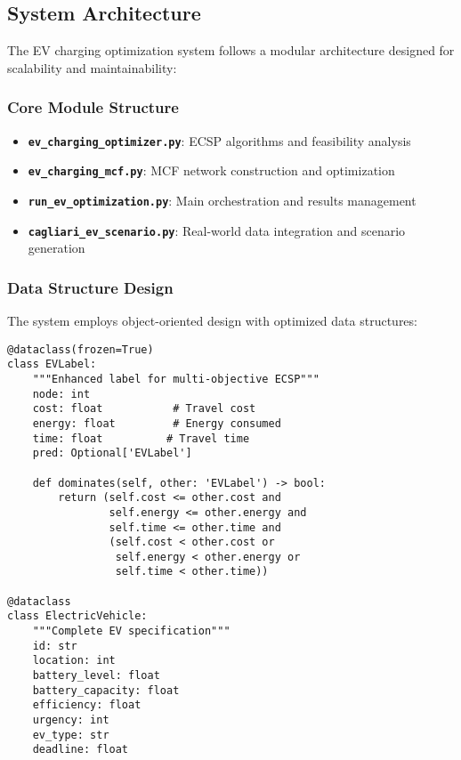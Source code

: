 \documentclass[12pt,a4paper]{article}
\begin{document}
\subsection{System Architecture}

The EV charging optimization system follows a modular architecture designed for scalability and maintainability:

\subsubsection{Core Module Structure}
\begin{itemize}
    \item \textbf{\texttt{ev\_charging\_optimizer.py}}: ECSP algorithms and feasibility analysis
    \item \textbf{\texttt{ev\_charging\_mcf.py}}: MCF network construction and optimization
    \item \textbf{\texttt{run\_ev\_optimization.py}}: Main orchestration and results management
    \item \textbf{\texttt{cagliari\_ev\_scenario.py}}: Real-world data integration and scenario generation
\end{itemize}

\subsubsection{Data Structure Design}
The system employs object-oriented design with optimized data structures:

\begin{lstlisting}[caption=Core Data Structures]
@dataclass(frozen=True)
class EVLabel:
    """Enhanced label for multi-objective ECSP"""
    node: int
    cost: float           # Travel cost
    energy: float         # Energy consumed
    time: float          # Travel time
    pred: Optional['EVLabel']
    
    def dominates(self, other: 'EVLabel') -> bool:
        return (self.cost <= other.cost and 
                self.energy <= other.energy and 
                self.time <= other.time and
                (self.cost < other.cost or 
                 self.energy < other.energy or 
                 self.time < other.time))

@dataclass
class ElectricVehicle:
    """Complete EV specification"""
    id: str
    location: int
    battery_level: float
    battery_capacity: float
    efficiency: float
    urgency: int
    ev_type: str
    deadline: float
\end{lstlisting}
\end{document}
